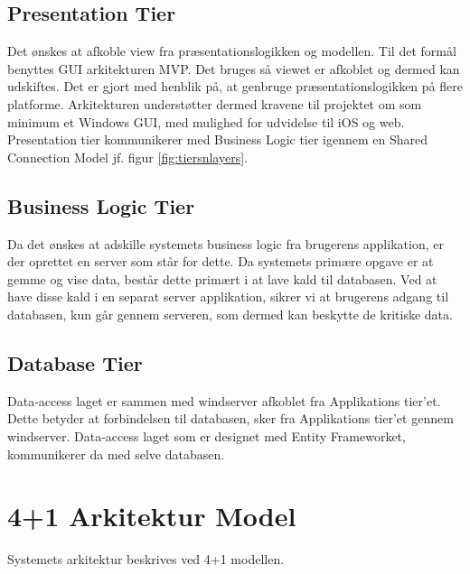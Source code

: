 \subsection{Presentation Tier}
Det ønskes at afkoble view fra præsentationslogikken og modellen. Til det formål benyttes GUI arkitekturen MVP. Det bruges så viewet er afkoblet og dermed kan udskiftes. Det er gjort med henblik på, at genbruge præsentationslogikken på flere platforme. Arkitekturen understøtter dermed kravene til projektet om som minimum et Windows GUI, med mulighed for udvidelse til iOS og web. Presentation tier kommunikerer med Business Logic tier igennem en Shared Connection Model jf. figur \ref{fig:tiersnlayers}. 

\subsection{Business Logic Tier}
Da det ønskes at adskille systemets business logic fra brugerens applikation, er der oprettet en server som står for dette. Da systemets primære opgave er at gemme og vise data, består dette primært i at lave kald til databasen. Ved at have disse kald i en separat server applikation, sikrer vi at brugerens adgang til databasen, kun går gennem serveren, som dermed kan beskytte de kritiske data.

\subsection{Database Tier}
Data-access laget er sammen med \gls{windserver} afkoblet fra Applikations tier'et. Dette betyder at forbindelsen til databasen, sker fra Applikations tier'et gennem \gls{windserver}. Data-access laget som er designet med Entity Frameworket, kommunikerer da med selve databasen.

\section{4+1 Arkitektur Model}
Systemets arkitektur beskrives ved 4+1 modellen.


